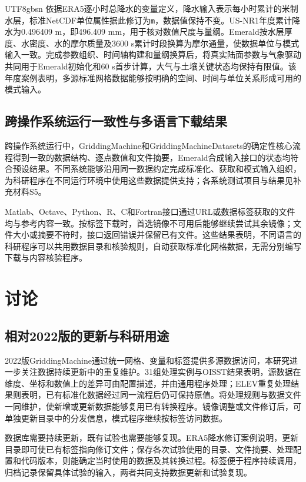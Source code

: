\documentclass[numdoi]{chinese}
\begin{document}
\begin{CJK}{UTF8}{gbsn}
依据ERA5逐小时总降水的变量定义\cite{ref11}，降水输入表示每小时累计的米制水层，标准NetCDF单位属性据此修订为\nolinkurl{m}，数据值保持不变。US-NR1年度累计降水为0.496409 m，即496.409 mm，用于核对数值尺度与量纲。Emerald按水层厚度、水密度、水的摩尔质量及3600 s累计时段换算为摩尔通量，使数据单位与模式输入一致。完成参数组织、时间轴构建和量纲换算后，将真实陆面参数与气象驱动共同用于Emerald初始化和60 s首步计算，大气与土壤关键状态均保持有限值。该年度案例表明，多源标准网格数据能够按明确的空间、时间与单位关系形成可用的模式输入。

\subsection{跨操作系统运行一致性与多语言下载结果}
跨操作系统运行中，GriddingMachine和GriddingMachineDatasets的确定性核心流程得到一致的数据结构、逐点数值和文件摘要，Emerald合成输入接口的状态均符合预设结果。不同系统能够沿用同一数据约定完成标准化、获取和模式输入组织，为科研程序在不同运行环境中使用这些数据提供支持；各系统测试项目与结果见补充材料S5。

Matlab、Octave、Python、R、C和Fortran接口通过URL或数据标签获取的文件均与参考内容一致。按标签下载时，首选镜像不可用后能够继续尝试其余镜像；文件大小或摘要不符时，接口返回错误并保留已有文件。这些结果表明，不同语言的科研程序可以共用数据目录和核验规则，自动获取标准化网格数据，无需分别编写下载与内容核验程序。

\section{讨论}
\subsection{相对2022版的更新与科研用途}
2022版GriddingMachine通过统一网格、变量和标签提供多源数据访问\cite{ref5}，本研究进一步关注数据持续更新中的重复维护。31组处理实例与OISST结果表明，源数据在维度、坐标和数值上的差异可由配置描述，并由通用程序处理；ELEV重复处理结果则表明，已有标准化数据经过同一流程后仍可保持原值。将处理规则与数据文件一同维护，使新增或更新数据能够复用已有转换程序。镜像调整或文件修订后，可单独更新目录中的分发信息，模式程序继续按标签访问数据。

数据库需要持续更新，既有试验也需要能够复现。ERA5降水修订案例说明，更新目录即可使已有标签指向修订文件；保存各次试验使用的目录、文件摘要、处理配置和代码版本，则能确定当时使用的数据及其转换过程。标签便于程序持续调用，归档记录保留具体试验的输入，两者共同支持数据更新和试验复现。


\end{CJK}
\end{document}
